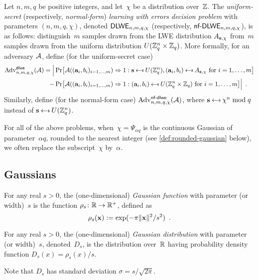\begin{definition}%
  \label{def:dlweproblem}
  Let $n, m, q$ be positive integers, and let~$\chi$ be a distribution
  over~$\mathbb{Z}$.  The \emph{uniform-secret} (respectively,
  \emph{normal-form}) \emph{learning with errors decision problem}
  with parameters $(n, m, q, \chi)$, denoted $\textsf{\upshape\mdseries DLWE}_{n,m,q,\chi}$ 
  (respectively, $\textsf{\upshape\mdseries nf-DLWE}_{n,m,q,\chi}$), is as follows: distinguish~$m$
  samples drawn from the LWE distribution $A_{\mathbf{s}, \chi}$ from~$m$
  samples drawn from the uniform distribution
  $U(\mathbb{Z}_q^n \times \mathbb{Z}_q)$.  More formally, for an adversary
  $\mathcal{A}$, define (for the uniform-secret case)
  \begin{align*}
    \Adv{\dlwe}{n,m,q,\chi}(\Adversary) = \Big|
      &\Pr \bracks*{
      \Adversary((\bfa_{i}, b_{i})_{i=1,\ldots,m}) \Rightarrow 1 :
      \bfs \getsr U(\bbZ_q^n), (\bfa_{i}, b_{i}) \getsr
      A_{\bfs,\chi} \text{ for } i=1,\ldots, m } \\
    - &\Pr \bracks*{
      \Adversary((\bfa_{i}, b_{i})_{i=1,\ldots,m}) \Rightarrow 1 :
      (\bfa_{i}, b_{i}) \getsr U(\bbZ_{q}^{n} \times \bbZ_{q})
      \text{ for } i=1,\ldots, m } \Big| \enspace .
  \end{align*}
  Similarly, define (for the normal-form case)
  $\mathrm{Adv}^{\textsf{\upshape\mdseries \textsf{\upshape\mdseries nf-dlwe}}}_{n,m,q,\chi}(\mathcal{A})$,  where
  $\bfs \getsr \chi^{n} \bmod q$ instead of
  $\bfs \getsr U(\bbZ_{q}^{n})$.
\end{definition}

For all of the above problems, when~$\chi = \Psi_{\alpha q}$ is the
continuous Gaussian of parameter~$\alpha q$, rounded to the nearest
integer (see \autoref{def:rounded-gaussian} below), we often
replace the subscript~$\chi$ by~$\alpha$.

\subsection{Gaussians}%
\label{sec:gaussians}

For any real $s > 0$, the (one-dimensional) \emph{Gaussian function}
with parameter (or width)~$s$ is the function
$\rho_{s} \colon \mathbb{R} \to \mathbb{R}^{+}$, defined as
\[ \rho_s(\mathbf{x}) := \exp(-\pi \lVert\mathbf{x}\rVert^2/s^2) \enspace .\]

\begin{definition}%
  \label{def:gaussian}
  For any real $s > 0$, the (one-dimensional) \emph{Gaussian
    distribution} with parameter (or width)~$s$, denoted~$D_{s}$, is
  the distribution over~$\mathbb{R}$ having probability density function
  $D_{s}(x) = \rho_{s}(x)/s$.
\end{definition}
Note that $D_{s}$ has standard deviation $\sigma = s / \sqrt{2 \pi}$.

